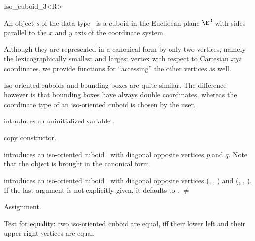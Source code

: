 \begin{ccRefClass} {Iso_cuboid_3<R>}

\ccDefinition  An object $s$ of the data type \ccRefName\ is a
cuboid in the Euclidean plane $\E^3$ with sides parallel to the $x$ and
$y$ axis of the coordinate system.
 
Although they are represented in a canonical form by only two
vertices, namely the lexicographically smallest and largest vertex
with respect to Cartesian $xyz$ coordinates, we provide
functions for ``accessing'' the other vertices as well.

Iso-oriented cuboids and bounding boxes are quite similar. The
difference however is that bounding boxes have always double coordinates, 
whereas the coordinate type of an iso-oriented cuboid is chosen by
the user.


\ccCreation
{}


\ccHidden {}
             {introduces an uninitialized variable \ccVar.}

\ccHidden {}
 	    {copy constructor.}

            {introduces an iso-oriented cuboid \ccVar\ with diagonal
             opposite vertices $p$ and $q$. Note that the object is 
             brought in the canonical form.}

            {introduces an iso-oriented cuboid \ccVar\ with diagonal
             opposite vertices 
             (, , ) and
             (, , ).  
             If the last argument 
             is not explicitly given, it defaults to .
             \ccPrecond {} $\neq$  }


\ccOperations
\ccHidden {}
        {Assignment.}

       {Test for equality: two iso-oriented cuboid are equal, iff their
        lower left and their upper right vertices are equal.}


\end{ccRefClass}
